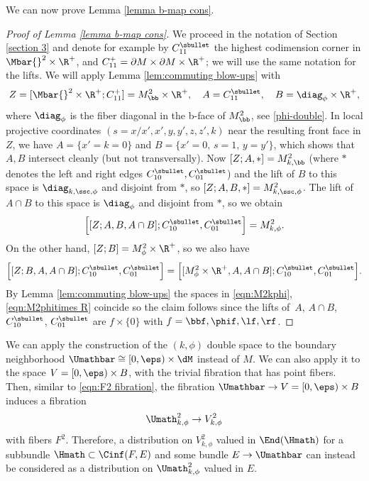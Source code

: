 We can now prove Lemma \ref{lemma b-map cons}.
\begin{proof} [Proof of Lemma \ref{lemma b-map cons}] We proceed in the notation of
Section \ref{section 3} and denote for example by $C_{11}^\sbullet$ the highest codimension corner in
$\Mbar{}^2 \times \R^+$, and $C_{11}^+ = \partial M\times\partial M\times \R^+$; we will use the same notation for the lifts.
We will apply
Lemma \ref{lem:commuting blow-ups} with
\[
Z=[\Mbar{}^2\times\R^+;C_{11}^+] = M^2_\bb\times\R^+, \quad
A=C_{11}^\sbullet, \quad B=\diag_\phi\times\R^+,
\]
where $\diag_\phi$ is the fiber diagonal in the b-face of $M^2_\bb$, see \eqref{phi-double}.
In local projective coordinates $(s=x/x', x', y,y',z,z',k)$ near the resulting front
face in $Z$, we have $A = \{x'=k=0\}$ and $B=\{x'=0,\, s=1,\, y=y'\}$, which shows that $A,B$ intersect cleanly {
(but not transversally).
Now $[Z;A,*]=M^2_{k,\bb}$ (where $*$ denotes the left and right edges $C_{10}^\sbullet,C_{01}^\sbullet$) and the lift of $B$ to this space is $\diag_{k,\ssc,\phi}$ and disjoint from $*$, so $[Z;A,B,*]= M^2_{k,\ssc,\phi}$. The lift of $A\cap B$ to this space is $\diag_\phi$ and disjoint from $*$, so we obtain}
\begin{equation}
\label{eqn:M2kphi}
\begin{split}
\Bigl[ [Z;A,B,A\cap B]; C_{10}^\sbullet,C_{01}^\sbullet\Bigr] = M^2_{k,\phi}.
\end{split}
\end{equation}
On the other hand, $[Z;B]=M^2_\phi\times\R^+$, so we also have
\begin{equation}
\label{eqn:M2phitimes R}
\Bigl[ [Z;B,A,A\cap B]; C_{10}^\sbullet,C_{01}^\sbullet\Bigr] = \Bigl[ [M^2_\phi \times \R^+,A,A\cap B]; C_{10}^\sbullet,C_{01}^\sbullet\Bigr].
\end{equation}
By Lemma \ref{lem:commuting blow-ups} the spaces in \eqref{eqn:M2kphi}, \eqref{eqn:M2phitimes R} coincide so the claim follows since the lifts of~$A$, $A\cap B$, $C_{10}^\sbullet$, $C_{01}^\sbullet$ are $f\times\{0\}$ with $f=\bbf, \phif, \lf,\rf$.
\end{proof}

We can apply the construction of the $(k,\phi)$ double space to the boundary neighborhood $\Umathbar\cong [0,\eps)\times\dM$ instead of $M$. We can also apply it to the space $V=[0,\eps)\times B$, with the trivial fibration that has point fibers. Then, similar to \eqref{eqn:F2 fibration}, the fibration $\Umathbar\to V=[0,\eps)\times B$ induces a fibration
\begin{equation}
\label{eqn:F2 fibration phi}
\Umath^2_{k,\phi} \to V^2_{k,\phi}
\end{equation}
with fibers $F^2$. Therefore, a distribution on $V^2_{k,\phi}$ valued in $\End(\Hmath)$ for a subbundle $\Hmath\subset \Cinf(F,E)$ and some bundle $E\to\Umathbar$ can instead be considered as a distribution on $\Umath^2_{k,\phi}$ valued in $E$.

